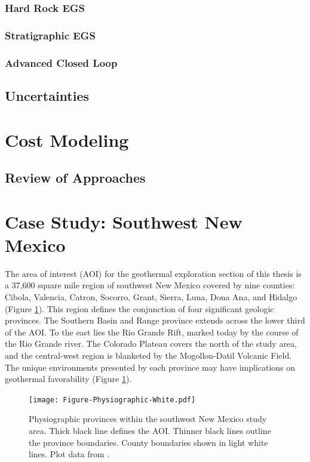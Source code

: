 \subsubsection{Hard Rock EGS}

\subsubsection{Stratigraphic EGS}

\subsubsection{Advanced Closed Loop}

\subsection{Uncertainties}

\section{Cost Modeling}\label{ch2:costmod}

\subsection{Review of Approaches}

\section{Case Study: Southwest New Mexico}\label{ch2:case}

The area of interest (AOI) for the geothermal exploration section of this thesis is a 37,600 square mile region of southwest New Mexico covered by nine counties: Cibola, Valencia, Catron, Socorro, Grant, Sierra, Luna, Dona Ana, and Hidalgo (Figure \ref{fig:phys-provinces}). This region defines the conjunction of four significant geologic provinces. The Southern Basin and Range province extends across the lower third of the AOI. To the east lies the Rio Grande Rift, marked today by the course of the Rio Grande river. The Colorado Plateau covers the north of the study area, and the central-west region is blanketed by the Mogollon-Datil Volcanic Field. The unique environments presented by each province may have implications on geothermal favorability \citep{pepin_new_2018} (Figure \ref{fig:phys-provinces}).

\begin{figure}[h!]
\centering
\texttt{[image: Figure-Physiographic-White.pdf]}
\caption[Physiographic provinces of southwest New Mexico]{Physiographic provinces within the southwest New Mexico study area. Thick black line defines the AOI. Thinner black lines outline the province boundaries. County boundaries shown in light white lines. Plot data from \protect\citep[~Figure 2-2]{bielicki_hydrogeolgic_2015}.}
\label{fig:phys-provinces}
\end{figure}

